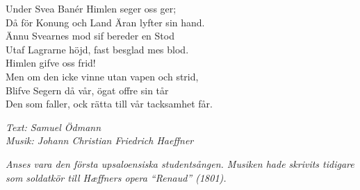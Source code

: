 \vspace{10pt}
Under Svea Banér Himlen seger oss ger;\\
Då för Konung och Land Äran lyfter sin hand.\\
Ännu Svearnes mod sif bereder en Stod\\
Utaf Lagrarne höjd, fast besglad mes blod.\\
Himlen gifve oss frid!\\
Men om den icke vinne utan vapen och strid,\\
Blifve Segern då vår, ögat offre sin tår\\
Den som faller, ock rätta till vår tacksamhet får.\par
\vspace{10pt}
{\footnotesize\textit{Text: Samuel Ödmann\\ Musik: Johann Christian
Friedrich Haeffner}}\par
{\footnotesize\textit{Anses vara den första upsaloensiska studentsången. Musiken hade
skrivits tidigare som soldatkör till Hæffners opera “Renaud”
(1801).}}\par
{}
